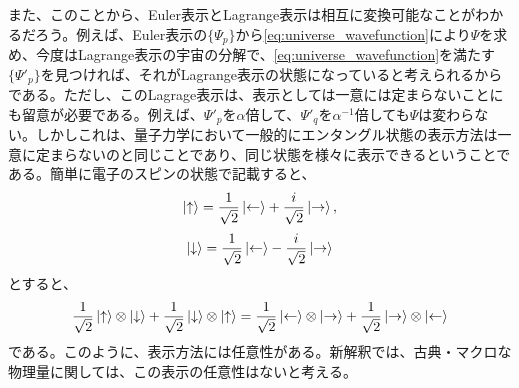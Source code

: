 また、このことから、Euler表示とLagrange表示は相互に変換可能なことがわかるだろう。例えば、Euler表示の$\{\Psi_p\}$から\eqref{eq:universe_wavefunction}により$\Psi$を求め、今度はLagrange表示の宇宙の分解で、\eqref{eq:universe_wavefunction}を満たす$\{\Psi'_p\}$を見つければ、それがLagrange表示の状態になっていると考えられるからである。ただし、このLagrage表示は、表示としては一意には定まらないことにも留意が必要である。例えば、$\Psi'_p$を$\alpha$倍して、$\Psi'_q$を$\alpha^{-1}$倍しても$\Psi$は変わらない。しかしこれは、量子力学において一般的にエンタングル状態の表示方法は一意に定まらないのと同じことであり、同じ状態を様々に表示できるということである。簡単に電子のスピンの状態で記載すると、
\begin{equation}
    \ket{\uparrow}=\frac{1}{\sqrt{2}}\ket{\leftarrow}+\frac{i}{\sqrt{2}}\ket{\rightarrow},
\end{equation}
\begin{equation}
    \ket{\downarrow}=\frac{1}{\sqrt{2}}\ket{\leftarrow}-\frac{i}{\sqrt{2}}\ket{\rightarrow}
\end{equation}
とすると、
\begin{equation}
    \frac{1}{\sqrt{2}}\ket{\uparrow} \otimes \ket{\downarrow} + \frac{1}{\sqrt{2}}\ket{\downarrow} \otimes \ket{\uparrow}
    = 
    \frac{1}{\sqrt{2}}\ket{\leftarrow} \otimes \ket{\rightarrow} + \frac{1}{\sqrt{2}}\ket{\rightarrow} \otimes \ket{\leftarrow}
\end{equation}
である。このように、表示方法には任意性がある。新解釈では、古典・マクロな物理量に関しては、この表示の任意性はないと考える。